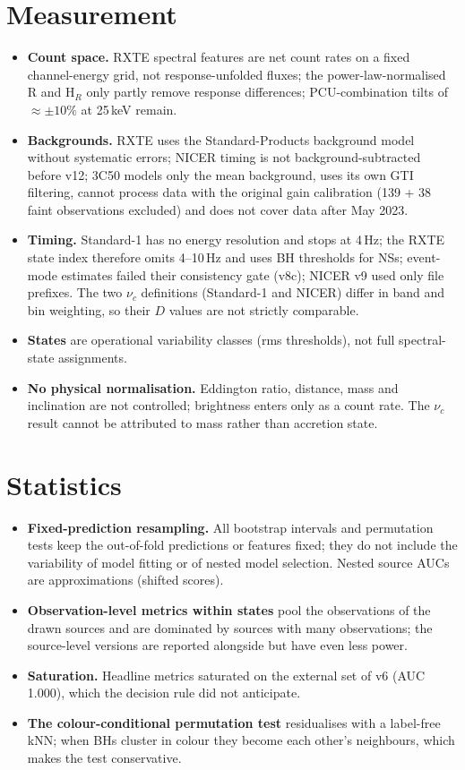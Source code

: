 \section{Measurement}
\begin{itemize}
\item \textbf{Count space.} RXTE spectral features are net count rates on a fixed channel-energy grid, not response-unfolded fluxes; the
power-law-normalised R and H$_R$ only partly remove response differences; PCU-combination tilts of $\approx\pm10\%$ at 25\,keV remain.
\item \textbf{Backgrounds.} RXTE uses the Standard-Products background model without systematic errors; NICER timing is not background-subtracted
before v12; 3C50 models only the mean background, uses its own GTI filtering, cannot process data with the original gain calibration
(139 + 38 faint observations excluded) and does not cover data after May 2023.
\item \textbf{Timing.} Standard-1 has no energy resolution and stops at 4\,Hz; the RXTE state index therefore omits 4--10\,Hz and uses BH
thresholds for NSs; event-mode estimates failed their consistency gate (v8c); NICER v9 used only file prefixes. The two $\nu_c$
definitions (Standard-1 and NICER) differ in band and bin weighting, so their $D$ values are not strictly comparable.
\item \textbf{States} are operational variability classes (rms thresholds), not full spectral-state assignments.
\item \textbf{No physical normalisation.} Eddington ratio, distance, mass and inclination are not controlled; brightness enters only as a count
rate. The $\nu_c$ result cannot be attributed to mass rather than accretion state.
\end{itemize}

\section{Statistics}
\begin{itemize}
\item \textbf{Fixed-prediction resampling.} All bootstrap intervals and permutation tests keep the out-of-fold predictions or features fixed; they
do not include the variability of model fitting or of nested model selection. Nested source AUCs are approximations (shifted scores).
\item \textbf{Observation-level metrics within states} pool the observations of the drawn sources and are dominated by sources with many
observations; the source-level versions are reported alongside but have even less power.
\item \textbf{Saturation.} Headline metrics saturated on the external set of v6 (AUC 1.000), which the decision rule did not anticipate.
\item \textbf{The colour-conditional permutation test} residualises with a label-free kNN; when BHs cluster in colour they become each other's
neighbours, which makes the test conservative.
\end{itemize}

